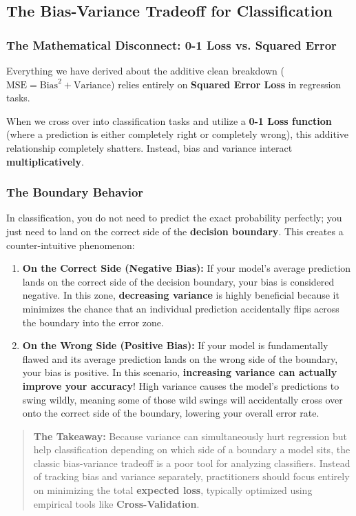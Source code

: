 \documentclass{article}
\begin{document}
\subsection{The Bias-Variance Tradeoff for Classification}

\subsubsection{The Mathematical Disconnect: 0-1 Loss vs. Squared Error}
Everything we have derived about the additive clean breakdown ($\text{MSE} = \text{Bias}^2 + \text{Variance}$) relies entirely on \textbf{Squared Error Loss} in regression tasks. 

When we cross over into classification tasks and utilize a \textbf{0-1 Loss function} (where a prediction is either completely right or completely wrong), this additive relationship completely shatters. Instead, bias and variance interact \textbf{multiplicatively}.

\subsubsection{The Boundary Behavior}
In classification, you do not need to predict the exact probability perfectly; you just need to land on the correct side of the \textbf{decision boundary}. This creates a counter-intuitive phenomenon:

\begin{enumerate}
    \item \textbf{On the Correct Side (Negative Bias):} If your model's average prediction lands on the correct side of the decision boundary, your bias is considered negative. In this zone, \textbf{decreasing variance} is highly beneficial because it minimizes the chance that an individual prediction accidentally flips across the boundary into the error zone.
    \item \textbf{On the Wrong Side (Positive Bias):} If your model is fundamentally flawed and its average prediction lands on the wrong side of the boundary, your bias is positive. In this scenario, \textbf{increasing variance can actually improve your accuracy}! High variance causes the model's predictions to swing wildly, meaning some of those wild swings will accidentally cross over onto the correct side of the boundary, lowering your overall error rate.
\end{enumerate}

\begin{quotation}
\textbf{The Takeaway:} Because variance can simultaneously hurt regression but help classification depending on which side of a boundary a model sits, the classic bias-variance tradeoff is a poor tool for analyzing classifiers. Instead of tracking bias and variance separately, practitioners should focus entirely on minimizing the total \textbf{expected loss}, typically optimized using empirical tools like \textbf{Cross-Validation}.
\end{quotation}
\end{document}
